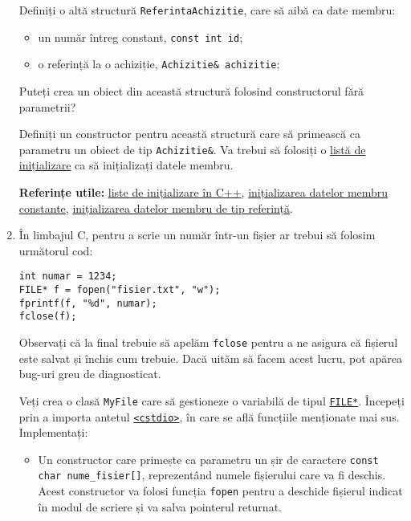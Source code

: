 \begin{enumerate}
    Definiți o altă structură \texttt{ReferintaAchizitie}, care să aibă ca date membru:
    \begin{itemize}
        \item un număr întreg constant, \texttt{const int id};
        \item o referință la o achiziție, \texttt{Achizitie\& achizitie};
    \end{itemize}
    Puteți crea un obiect din această structură folosind constructorul fără parametrii?

    Definiți un constructor pentru această structură care să primească ca parametru un obiect de tip \texttt{Achizitie\&}. Va trebui să folosiți o \href{https://www.geeksforgeeks.org/when-do-we-use-initializer-list-in-c/}{listă de inițializare} ca să inițializați datele membru.

    \textbf{Referințe utile:} \href{https://www.geeksforgeeks.org/when-do-we-use-initializer-list-in-c/}{liste de inițializare în C++}, \href{https://www.tutorialspoint.com/how-to-initialize-const-member-variable-in-a-cplusplus-class}{inițializarea datelor membru constante}, \href{https://stackoverflow.com/a/1701456/5723188}{inițializarea datelor membru de tip referință}.

    \item În limbajul C, pentru a scrie un număr într-un fișier ar trebui să folosim următorul cod:
    \begin{lstlisting}
int numar = 1234;
FILE* f = fopen("fisier.txt", "w");
fprintf(f, "%d", numar);
fclose(f);
    \end{lstlisting}
    Observați că la final trebuie să apelăm \texttt{fclose} pentru a ne asigura că fișierul este salvat și închis cum trebuie. Dacă uităm să facem acest lucru, pot apărea bug-uri greu de diagnosticat.

    Veți crea o clasă \texttt{MyFile} care să gestioneze o variabilă de tipul \href{https://en.cppreference.com/w/cpp/io/c/FILE}{\texttt{FILE*}}. Începeți prin a importa antetul \href{https://en.cppreference.com/w/cpp/header/cstdio}{\texttt{<cstdio>}}, în care se află funcțiile menționate mai sus. Implementați:
    \begin{itemize}
        \item Un constructor care primește ca parametru un șir de caractere \texttt{const char nume\_fisier[]}, reprezentând numele fișierului care va fi deschis. Acest constructor va folosi funcția \texttt{fopen} pentru a deschide fișierul indicat în modul de scriere și va salva pointerul returnat.


\end{itemize}
\end{enumerate}
